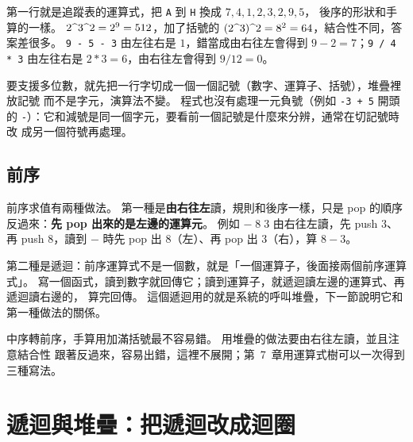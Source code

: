 \endgroup

第一行就是追蹤表的運算式，把 \texttt{A} 到 \texttt{H} 換成 $7, 4, 1, 2, 3, 2, 9, 5$，
後序的形狀和手算的一樣。 $2 \text{\textasciicircum} 3 \text{\textasciicircum} 2 = 2^9 = 512$，加了括號的
$(2 \text{\textasciicircum} 3) \text{\textasciicircum} 2 = 8^2 = 64$，結合性不同，答案差很多。 \texttt{9 - 5 - 3}
由左往右是 $1$，錯當成由右往左會得到 $9 - 2 = 7$；\texttt{9 / 4 * 3} 由左往右是
$2 * 3 = 6$，由右往左會得到 $9 / 12 = 0$。

要支援多位數，就先把一行字切成一個一個記號（數字、運算子、括號），堆疊裡放記號
而不是字元，演算法不變。 程式也沒有處理一元負號（例如 \texttt{-3 + 5} 開頭的
\texttt{-}）：它和減號是同一個字元，要看前一個記號是什麼來分辨，通常在切記號時改
成另一個符號再處理。

\subsection{前序}
\label{sec:sq-prefix}

前序求值有兩種做法。 第一種是\textbf{由右往左}讀，規則和後序一樣，只是 pop 的順序
反過來：\textbf{先 pop 出來的是左邊的運算元}。 例如 $-\;8\;3$ 由右往左讀，先 push
$3$、再 push $8$，讀到 $-$ 時先 pop 出 $8$（左）、再 pop 出 $3$（右），算 $8 - 3$。

第二種是遞迴：前序運算式不是一個數，就是「一個運算子，後面接兩個前序運算式」。
寫一個函式，讀到數字就回傳它；讀到運算子，就遞迴讀左邊的運算式、再遞迴讀右邊的，
算完回傳。 這個遞迴用的就是系統的呼叫堆疊，下一節說明它和第一種做法的關係。

中序轉前序，手算用加滿括號最不容易錯。 用堆疊的做法要由右往左讀，並且注意結合性
跟著反過來，容易出錯，這裡不展開；第~7~章用運算式樹可以一次得到三種寫法。

\section{遞迴與堆疊：把遞迴改成迴圈}
\label{sec:sq-recursion}

